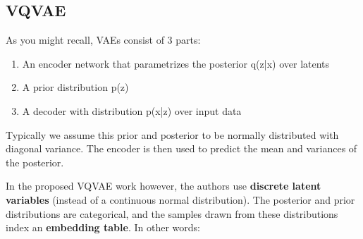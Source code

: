 \subsection{VQVAE}

As you might recall, VAEs consist of 3 parts:

   \begin{enumerate}
       \item  An encoder network that parametrizes the posterior q(z|x) over latents
       \item A prior distribution p(z)
       \item A decoder with distribution p(x|z) over input data
   \end{enumerate}
     
    
Typically we assume this prior and posterior to be normally distributed with diagonal variance. The encoder is then used to predict the mean and variances of the posterior.

In the proposed VQVAE work however, the authors use \textbf{discrete latent variables} (instead of a continuous normal distribution). The posterior and prior distributions are categorical, and the samples drawn from these distributions index an \textbf{embedding table}. In other words:

